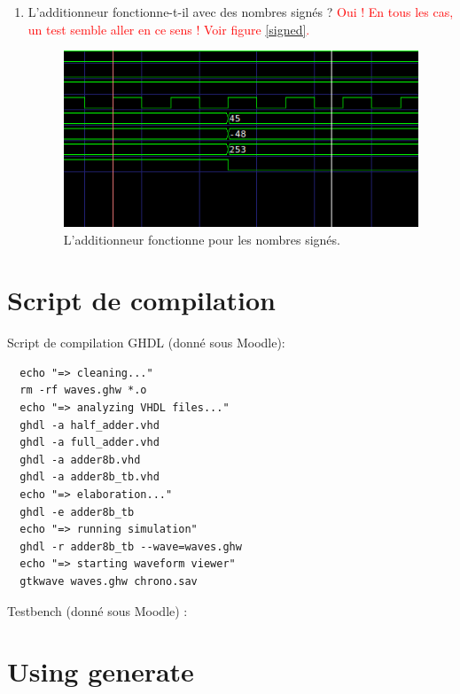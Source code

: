 \documentclass[a4paper,11pt]{article}
\begin{document}
\begin{enumerate}
  \item L'additionneur fonctionne-t-il avec des nombres signés ?
\textcolor{red}{Oui ! En tous les cas, un test semble aller en ce sens ! Voir figure \ref{signed}.}
\begin{figure}
  \centering
  \includegraphics[width=15cm]{./code/signed_values.png}
  \caption{L'additionneur fonctionne pour les nombres signés.}
  \label{fig:signed}
\end{figure}
\end{enumerate}


\section{Script de compilation}

Script de compilation GHDL (donné sous Moodle):
\begin{verbatim}
  echo "=> cleaning..."
  rm -rf waves.ghw *.o
  echo "=> analyzing VHDL files..."
  ghdl -a half_adder.vhd
  ghdl -a full_adder.vhd
  ghdl -a adder8b.vhd
  ghdl -a adder8b_tb.vhd
  echo "=> elaboration..."
  ghdl -e adder8b_tb
  echo "=> running simulation"
  ghdl -r adder8b_tb --wave=waves.ghw
  echo "=> starting waveform viewer"
  gtkwave waves.ghw chrono.sav
\end{verbatim}

Testbench (donné sous Moodle) :

\lstset{inputencoding=utf8}


\section{Using generate}
\lstset{inputencoding=utf8}

\end{document}
